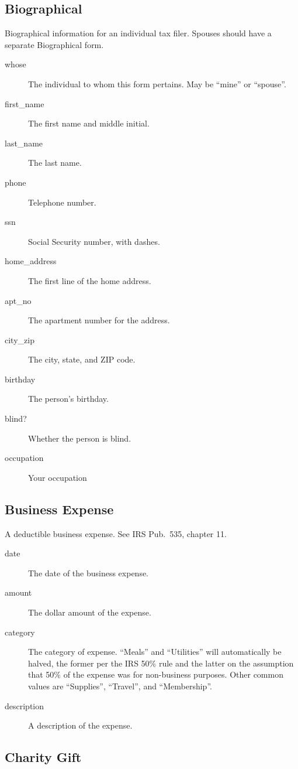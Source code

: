 \documentclass[12pt]{article}
\begin{document}
\subsection{Biographical}

Biographical information for an individual tax filer. Spouses should have a
separate Biographical form.

\begin{description}
\item[whose] The individual to whom this form pertains. May be ``mine'' or
``spouse''.
\item[first\_name] The first name and middle initial.
\item[last\_name] The last name.
\item[phone] Telephone number.
\item[ssn] Social Security number, with dashes.
\item[home\_address] The first line of the home address.
\item[apt\_no] The apartment number for the address.
\item[city\_zip] The city, state, and ZIP code.
\item[birthday] The person's birthday.
\item[blind?] Whether the person is blind.
\item[occupation] Your occupation
\end{description}

\subsection{Business Expense}

A deductible business expense. See IRS Pub.~535, chapter 11.

\begin{description}
\item[date] The date of the business expense.
\item[amount] The dollar amount of the expense.
\item[category] The category of expense. ``Meals'' and ``Utilities'' will
automatically be halved, the former per the IRS 50\% rule and the latter on the
assumption that 50\% of the expense was for non-business purposes. Other common
values are ``Supplies'', ``Travel'', and ``Membership''.
\item[description] A description of the expense.
\end{description}


\subsection{Charity Gift}
\end{document}
